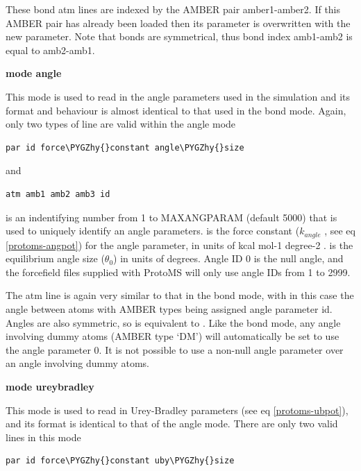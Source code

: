 \documentclass[letterpaper,10pt,english]{sphinxmanual}
\def\PYGZhy{\char`\-}
\begin{document}
These bond atm lines are indexed by the AMBER pair amber1-amber2. If this AMBER pair has already been loaded then its parameter is overwritten with the new parameter. Note that bonds are symmetrical, thus bond index amb1-amb2 is equal to amb2-amb1.

\textbf{mode angle}

This mode is used to read in the angle parameters used in the simulation and its format and behaviour is almost identical to that used in the bond mode. Again, only two types of line are valid within the angle mode

\begin{Verbatim}[commandchars=\\\{\}]
par id force\PYGZhy{}constant angle\PYGZhy{}size
\end{Verbatim}

and

\begin{Verbatim}[commandchars=\\\{\}]
atm amb1 amb2 amb3 id
\end{Verbatim}

 is an indentifying number from 1 to MAXANGPARAM (default 5000) that is used to uniquely identify an angle parameters.  is the force constant (\(k_{angle}\) , see eq \eqref{protoms-angpot}) for the angle parameter, in units of kcal mol-1 degree-2 .  is the equilibrium angle size (\(\theta_0\)) in units of degrees. Angle ID 0 is the null angle, and the forcefield files supplied with ProtoMS will only use angle IDs from 1 to 2999.

The atm line is again very similar to that in the bond mode, with in this case the angle between atoms with AMBER types  being assigned angle parameter id. Angles are also symmetric, so  is equivalent to . Like the bond mode, any angle involving dummy atoms (AMBER type ‘DM’) will automatically be set to use the angle parameter 0. It is not possible to use a non-null angle parameter over an angle involving dummy atoms.

\textbf{mode ureybradley}

This mode is used to read in Urey-Bradley parameters (see eq \eqref{protoms-ubpot}), and its format is identical to that of the angle mode. There are only two valid lines in this mode

\begin{Verbatim}[commandchars=\\\{\}]
par id force\PYGZhy{}constant uby\PYGZhy{}size
\end{Verbatim}
\end{document}
